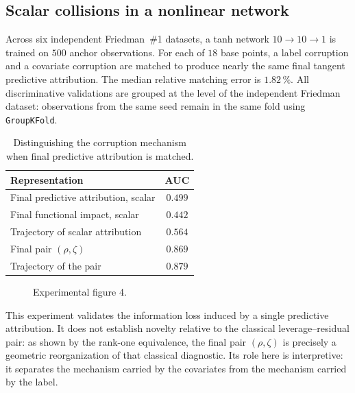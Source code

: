 \subsection{Scalar collisions in a nonlinear network}
Across six independent Friedman~\#1 datasets, a tanh network $10\to10\to1$ is trained on $500$ anchor observations. For each of $18$ base points, a label corruption and a covariate corruption are matched to produce nearly the same final tangent predictive attribution. The median relative matching error is $1.82\,\%$. All discriminative validations are grouped at the level of the independent Friedman dataset: observations from the same seed remain in the same fold using \texttt{GroupKFold}.

\begin{table}[H]
\centering
\caption{Distinguishing the corruption mechanism when final predictive attribution is matched.}
\label{tab:matched-collision}
\small
\begin{tabular}{@{}lc@{}}
\toprule
Representation & AUC \\
\midrule
Final predictive attribution, scalar & $0.499$ \\
Final functional impact, scalar & $0.442$ \\
Trajectory of scalar attribution & $0.564$ \\
Final pair $(\rho,\zeta)$ & $0.869$ \\
Trajectory of the pair & $0.879$ \\
\bottomrule
\end{tabular}
\end{table}

\begin{figure}[htbp]
\centering{}
\caption{Experimental figure 4.}\label{fig:matched-collision}
\end{figure}

This experiment validates the information loss induced by a single predictive attribution. It does not establish novelty relative to the classical leverage--residual pair: as shown by the rank-one equivalence, the final pair $(\rho,\zeta)$ is precisely a geometric reorganization of that classical diagnostic. Its role here is interpretive: it separates the mechanism carried by the covariates from the mechanism carried by the label.

